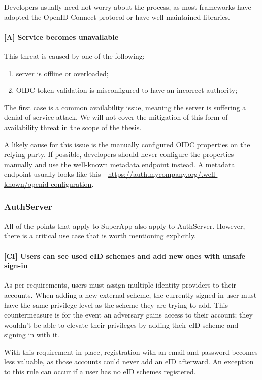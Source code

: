 Developers usually need not worry about the process, as most frameworks have adopted the OpenID Connect protocol or have well-maintained libraries.

\paragraph{[A] Service becomes unavailable} This threat is caused by one of the following:

\begin{enumerate}
  \item server is offline or overloaded;
  \item OIDC token validation is misconfigured to have an incorrect authority;
\end{enumerate}

The first case is a common availability issue, meaning the server is suffering a denial of service attack. We will not cover the mitigation of this form of availability threat in the scope of the thesis.

A likely cause for this issue is the manually configured OIDC properties on the relying party. If possible, developers should never configure the properties manually and use the well-known metadata endpoint instead. A metadata endpoint usually looks like this - \url{https://auth.mycompany.org/.well-known/openid-configuration}.


\subsubsection{AuthServer}

All of the points that apply to SuperApp also apply to AuthServer. However, there is a critical use case that is worth mentioning explicitly.

\paragraph{[CI] Users can see used eID schemes and add new ones with unsafe sign-in}

As per requirements, users must assign multiple identity providers to their accounts. When adding a new external scheme, the currently signed-in user must have the same privilege level as the scheme they are trying to add. This countermeasure is for the event an adversary gains access to their account; they wouldn't be able to elevate their privileges by adding their eID scheme and signing in with it.

With this requirement in place, registration with an email and password becomes less valuable, as those accounts could never add an eID afterward. An exception to this rule can occur if a user has no eID schemes registered.

